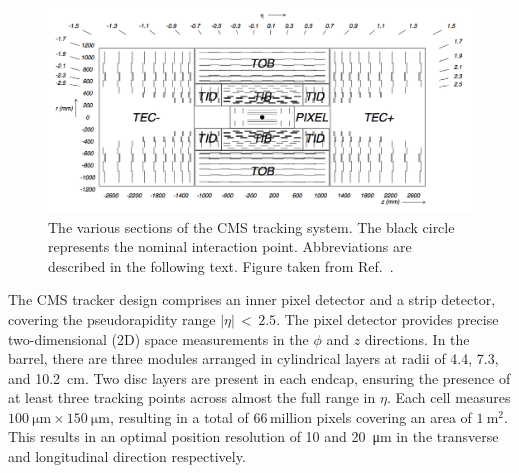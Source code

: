 \begin{figure}[h!]
  \centering
  \includegraphics[width=\textwidth]{Figures/Detector/TrackerUgly.png}
  \caption[The CMS tracker.]
  {
    The various sections of the CMS tracking system.
    The black circle represents the nominal interaction point.
    Abbreviations are described in the following text.
    Figure taken from Ref.~\cite{CMSdetector}.
  }
  \label{fig:detector_tracker}
\end{figure}

The CMS tracker design comprises an inner pixel detector and a strip detector, covering the pseudorapidity range $|\eta|\,<\,2.5$.
The pixel detector provides precise two-dimensional (2D) space measurements in the $\phi$ and $z$ directions.
In the barrel, there are three modules arranged in cylindrical layers at radii of 4.4, 7.3, and \SI{10.2}{cm}. 
Two disc layers are present in each endcap, ensuring the presence of at least three tracking points across almost the full range in $\eta$.
Each cell measures $\SI{100}{\micro\metre}\times\SI{150}{\micro\metre}$, resulting in a total of 66\,million pixels covering an area of $\SI{1}{\metre^2}$.
This results in an optimal position resolution of 10 and \SI{20}{\micro\metre} in the transverse and longitudinal direction respectively.

